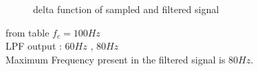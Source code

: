 \documentclass[journal,12pt,twocolumn]{IEEEtran}
\begin{document}
	
\begin{figure}
	\centering
	
	\caption{delta function of sampled and filtered signal }
\end{figure}
	from table $f_c = 100Hz$ \\
	LPF output : $60Hz$ , $80Hz$\\
	Maximum Frequency present in the filtered signal is $80Hz$.
	
	
	
\end{document}
